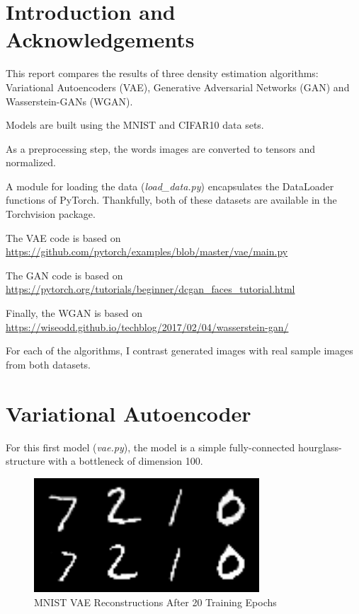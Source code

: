 \documentclass[letterpaper, 10pt]{article}
\begin{document}
\section{Introduction and Acknowledgements}

This report compares the results of three density estimation algorithms:
Variational Autoencoders (VAE), Generative Adversarial Networks (GAN) and Wasserstein-GANs (WGAN).

Models are built using the MNIST and CIFAR10 data sets.

As a preprocessing step, the words images are converted to tensors and normalized.

A module for loading the data ({\em load\_data.py}) encapsulates the DataLoader functions of PyTorch.
Thankfully, both of these datasets are available in the Torchvision package.

The VAE code is based on \url{https://github.com/pytorch/examples/blob/master/vae/main.py}

The GAN code is based on \url{https://pytorch.org/tutorials/beginner/dcgan_faces_tutorial.html}

Finally, the WGAN is based on \url{https://wiseodd.github.io/techblog/2017/02/04/wasserstein-gan/}

For each of the algorithms, I contrast generated images with real sample images from both datasets.

\section{Variational Autoencoder}

For this first model ({\em vae.py}), the model is a simple fully-connected hourglass-structure with a bottleneck of dimension 100.

\begin{figure}[h]
\caption{MNIST VAE Reconstructions After 20 Training Epochs}
\centering
\includegraphics[width=0.75\textwidth]{vae_reconstruction_20_epochs}
\end{figure}
\end{document}
